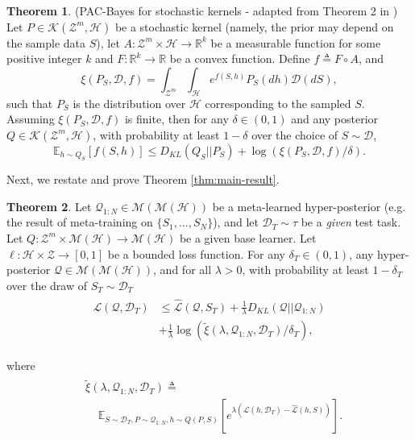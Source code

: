 \documentclass{article} %
\theoremstyle{definition}
\newtheorem{theorem}{Theorem}[section]
\newcommand{\Expect}[2]{\mathbb{E}_{#1}\left [#2 \right ]}
\begin{document}
\begin{theorem} (PAC-Bayes for stochastic kernels - adapted from Theorem 2 in \citet{Rivasplata2020}) \label{thm:rivasplata-pb-appendix}
	Let $P\in \mathcal{K}(\mathcal{Z}^m, \mathcal{H})$ be a stochastic kernel (namely, the prior may depend on the sample data $S$), let $A: \mathcal{Z}^m\times \mathcal{H}\rightarrow \mathbb{R}^k$ be a measurable function for some positive integer $k$ and $F:\mathbb{R}^k\rightarrow \mathbb{R}$ be a convex function.
	Define $f\triangleq F\circ A$, and  
	$$
	\xi(P_S, \mathcal{D}, f)=\int_{\mathcal{Z}^m}\int_{\mathcal{H}}e^{f(S, h)}P_S(dh)\mathcal{D}(dS) , 
	$$
	such that $P_S$ is the distribution over $\mathcal{H}$ corresponding to the sampled $S$. Assuming $\xi(P_S, \mathcal{D}, f)$ is finite, then for any $\delta \in (0,1)$ and any posterior $Q\in \mathcal{K}(\mathcal{Z}^m, \mathcal{H})$, with probability at least $1-\delta$ over the choice of $S\sim \mathcal{D}$,
	\begin{equation} \label{eq:ribasplata-pb-appendix}
	\Expect{h\sim Q_S}{f(S, h)} \leq D_{KL}(Q_S||P_S)+\log\left (\xi(P_S, \mathcal{D}, f)/\delta\right ) .
	\end{equation}
\end{theorem}
%
Next, we restate and prove Theorem \ref{thm:main-result}. 
\begin{theorem} 
	Let $\mathcal{Q}_{1:N}\in \mathcal{M}(\mathcal{M}(\mathcal{H}))$ be a meta-learned hyper-posterior (e.g. the result of meta-training on $\{S_1,...,S_N\}$), and let $\mathcal{D}_T\sim \tau$ be a \emph{given} test task. Let $Q: \mathcal{Z}^m\times\mathcal{M}(\mathcal{H})\rightarrow \mathcal{M}(\mathcal{H})$ be a given base learner. Let $\ell: \mathcal{H}\times \mathcal{Z}\rightarrow [0, 1]$ be a bounded loss function.
	For any $\delta_T \in (0,1)$, any hyper-posterior $\mathcal{Q}\in \mathcal{M}(\mathcal{M}(\mathcal{H}))$, and for all $\lambda>0$, with probability at least $1-\delta_T$ over the draw of $S_T\sim \mathcal{D}_T$
%	
	\begin{align}
	\begin{split}
	\mathcal{L}(\mathcal{Q}, \mathcal{D}_T) &\leq \hat{\mathcal{L}}(\mathcal{Q}, S_T) + \frac{1}{\lambda}D_{KL}(\mathcal{Q}||\mathcal{Q}_{1:N})\\
	&+\frac{1}{\lambda}\log\left (\tilde{\xi}(\lambda,\mathcal{Q}_{1:N},\mathcal{D}_T)/\delta_T\right ) ,
	\end{split}
	\end{align}
	
	where 
	\begin{align} \label{eq:tilde_xi}
	\begin{split}
	&\tilde{\xi}(\lambda,\mathcal{Q}_{1:N},\mathcal{D}_T)\triangleq \\
	&\;\;\;\; \Expect{S\sim \mathcal{D}_T, P\sim \mathcal{Q}_{1:N}, h\sim Q(P,S)}{e^{\lambda\left (\mathcal{L}(h, \mathcal{D}_T)-\hat{\mathcal{L}}(h, S)\right )}} .
	\end{split}
	\end{align}
\end{theorem}
\end{document}
